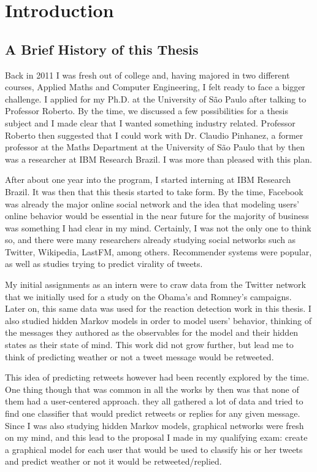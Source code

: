 \chapter{Introduction}

\section{A Brief History of this Thesis}

Back in 2011 I was fresh out of college and, having majored in two different courses, Applied Maths and Computer Engineering, I felt ready to face a bigger challenge. I applied for my Ph.D. at the University of São Paulo after talking to Professor Roberto. By the time, we discussed a few possibilities for a thesis subject and I made clear that I wanted something industry related. Professor Roberto then suggested that I could work with Dr. Claudio Pinhanez, a former professor at the Maths Department at the University of São Paulo that by then was a researcher at IBM Research Brazil. I was more than pleased with this plan.

After about one year into the program, I started interning at IBM Research Brazil. It was then that this thesis started to take form. By the time, Facebook was already the major online social network and the idea that modeling users' online behavior would be essential in the near future for the majority of business was something I had clear in my mind. Certainly, I was not the only one to think so, and there were many researchers already studying social networks such as Twitter, Wikipedia, LastFM, among others. Recommender systems were popular, as well as studies trying to predict virality of tweets. 

My initial assignments as an intern were to craw data from the Twitter network that we initially used for a study on the Obama's and Romney's campaigns. Later on, this same data was used for the reaction detection work in this thesis. I also studied hidden Markov models in order to model users' behavior, thinking of the messages they authored as the observables for the model and their hidden states as their state of mind. This work did not grow further, but lead me to think of predicting weather or not a tweet message would be retweeted.

This idea of predicting retweets however had been recently explored by the time. One thing though that was common in all the works by then was that none of them had a user-centered approach. they all gathered a lot of data and tried to find one classifier that would predict retweets or replies for any given message. Since I was also studying hidden Markov models, graphical networks were fresh on my mind, and this lead to the proposal I made in my qualifying exam: create a graphical model for each user that would be used to classify his or her tweets and predict weather or not it would be retweeted/replied. 

